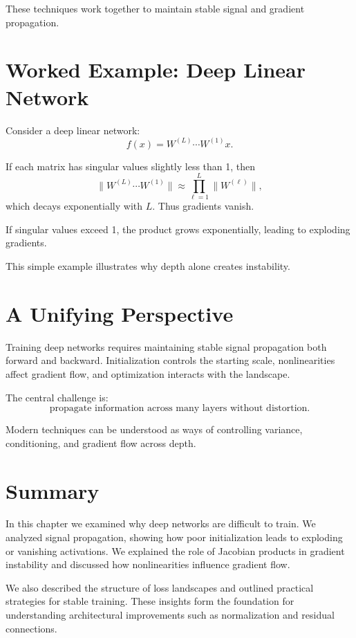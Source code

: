 These techniques work together to maintain stable signal and gradient propagation.

\section{Worked Example: Deep Linear Network}

Consider a deep linear network:
\[
f(x)=W^{(L)}\cdots W^{(1)}x.
\]

If each matrix has singular values slightly less than 1, then
\[
\|W^{(L)}\cdots W^{(1)}\| \approx \prod_{\ell=1}^L \|W^{(\ell)}\|,
\]
which decays exponentially with $L$. Thus gradients vanish.

If singular values exceed 1, the product grows exponentially, leading to exploding gradients.

This simple example illustrates why depth alone creates instability.

\section{A Unifying Perspective}

Training deep networks requires maintaining stable signal propagation both forward and backward. Initialization controls the starting scale, nonlinearities affect gradient flow, and optimization interacts with the landscape.

The central challenge is:
\[
\text{propagate information across many layers without distortion.}
\]

Modern techniques can be understood as ways of controlling variance, conditioning, and gradient flow across depth.

\section{Summary}

In this chapter we examined why deep networks are difficult to train. We analyzed signal propagation, showing how poor initialization leads to exploding or vanishing activations. We explained the role of Jacobian products in gradient instability and discussed how nonlinearities influence gradient flow.

We also described the structure of loss landscapes and outlined practical strategies for stable training. These insights form the foundation for understanding architectural improvements such as normalization and residual connections.
